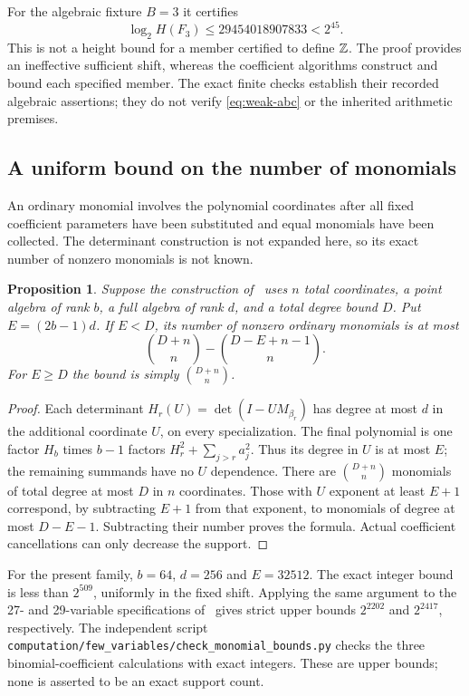 \documentclass[11pt,a4paper]{article}
\newtheorem{proposition}[theorem]{Proposition}
\begin{document}
For the algebraic fixture $B=3$ it certifies
\[
 \log_2 H(F_3)\le29454018907833<2^{45}.
\]
This is not a height bound for a member certified to define $\mathbb Z$.
The proof provides an ineffective sufficient shift, whereas the
coefficient algorithms construct and bound each specified member.
The exact finite checks establish their recorded algebraic assertions;
they do not verify \eqref{eq:weak-abc} or the inherited arithmetic premises.

\subsection{A uniform bound on the number of monomials}

An ordinary monomial involves the polynomial coordinates after all
fixed coefficient parameters have been substituted and equal monomials
have been collected. The determinant construction is not expanded here,
so its exact number of nonzero monomials is not known.

\begin{proposition}
Suppose the construction of~\cite{Active} uses $n$ total coordinates,
a point algebra of rank $b$, a full algebra of rank $d$, and a total
degree bound $D$. Put $E=(2b-1)d$. If $E<D$, its number of nonzero
ordinary monomials is at most
\[
                 \binom{D+n}{n}-\binom{D-E+n-1}{n}.
\]
For $E\ge D$ the bound is simply $\binom{D+n}{n}$.
\end{proposition}
\begin{proof}
Each determinant $H_r(U)=\det(I-U M_{\beta_r})$ has degree at
most $d$ in the additional coordinate $U$, on every specialization.
The final polynomial is one factor $H_b$ times $b-1$ factors
$H_r^2+\sum_{j>r}a_j^2$. Thus its degree in $U$ is at most $E$;
the remaining summands have no $U$ dependence. There are
$\binom{D+n}{n}$ monomials of total degree at most $D$ in $n$
coordinates. Those with $U$ exponent at least $E+1$ correspond,
by subtracting $E+1$ from that exponent, to monomials of degree
at most $D-E-1$. Subtracting their number proves the formula.
Actual coefficient cancellations can only decrease the support.
\end{proof}

For the present family, $b=64$, $d=256$ and $E=32512$.
The exact integer bound is less than $2^{509}$, uniformly in the
fixed shift. Applying the same argument to the 27- and 29-variable
specifications of~\cite{Active} gives strict upper bounds
$2^{2202}$ and $2^{2417}$, respectively. The independent script
\nolinkurl{computation/few_variables/check_monomial_bounds.py}
checks the three binomial-coefficient calculations with exact integers.
These are upper bounds; none is asserted to be an exact support count.
\end{document}
